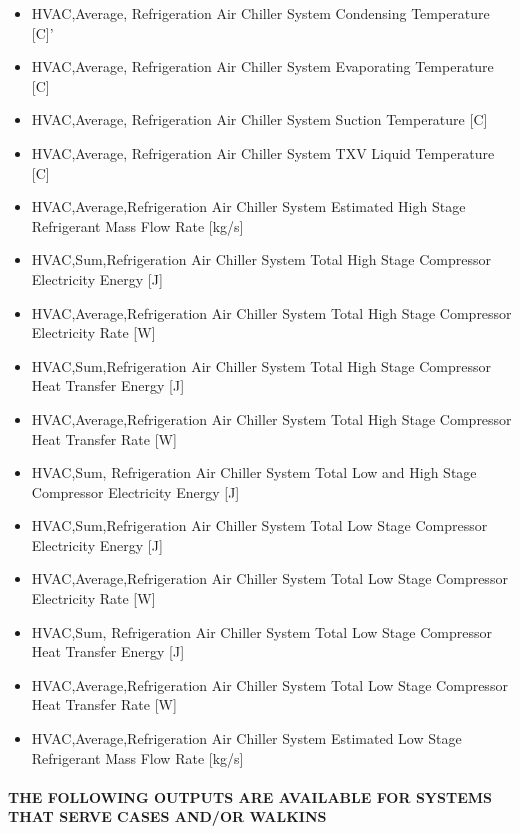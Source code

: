 \begin{itemize}
\item
  HVAC,Average, Refrigeration Air Chiller System Condensing Temperature {[}C{]}'
\item
  HVAC,Average, Refrigeration Air Chiller System Evaporating Temperature {[}C{]}
\item
  HVAC,Average, Refrigeration Air Chiller System Suction Temperature {[}C{]}
\item
  HVAC,Average, Refrigeration Air Chiller System TXV Liquid Temperature {[}C{]}
\item
  HVAC,Average,Refrigeration Air Chiller System Estimated High Stage Refrigerant Mass Flow Rate {[}kg/s{]}
\item
  HVAC,Sum,Refrigeration Air Chiller System Total High Stage Compressor Electricity Energy {[}J{]}
\item
  HVAC,Average,Refrigeration Air Chiller System Total High Stage Compressor Electricity Rate {[}W{]}
\item
  HVAC,Sum,Refrigeration Air Chiller System Total High Stage Compressor Heat Transfer Energy {[}J{]}
\item
  HVAC,Average,Refrigeration Air Chiller System Total High Stage Compressor Heat Transfer Rate {[}W{]}
\item
  HVAC,Sum, Refrigeration Air Chiller System Total Low and High Stage Compressor Electricity Energy {[}J{]}
\item
  HVAC,Sum,Refrigeration Air Chiller System Total Low Stage Compressor Electricity Energy {[}J{]}
\item
  HVAC,Average,Refrigeration Air Chiller System Total Low Stage Compressor Electricity Rate {[}W{]}
\item
  HVAC,Sum, Refrigeration Air Chiller System Total Low Stage Compressor Heat Transfer Energy {[}J{]}
\item
  HVAC,Average,Refrigeration Air Chiller System Total Low Stage Compressor Heat Transfer Rate {[}W{]}
\item
  HVAC,Average,Refrigeration Air Chiller System Estimated Low Stage Refrigerant Mass Flow Rate {[}kg/s{]}
\end{itemize}

\paragraph{THE FOLLOWING OUTPUTS ARE AVAILABLE FOR SYSTEMS THAT SERVE CASES AND/OR WALKINS}\label{the-following-outputs-are-available-for-systems-that-serve-cases-andor-walkins}

